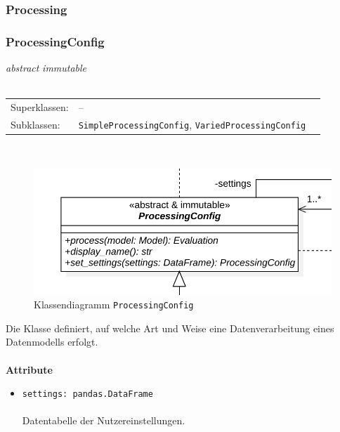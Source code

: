 \documentclass{article}
\begin{document}
\begin{itemize}
\newpage
\subsubsection{Processing}

\subsubsection*{\large{\textbf{ProcessingConfig}\label{cls:ProcessingConfig}}}
\textit{\flqq{}abstract\frqq} \textit{\flqq{}immutable\frqq}\normalsize\\\\
\begin{tabular}{lll}
 Superklassen: & --\\
 Subklassen: & \texttt{SimpleProcessingConfig}, \texttt{VariedProcessingConfig}
\end{tabular}\\
\begin{figure}[H]%
    \centering
    \includegraphics[width=13cm]{entwurf/Entwurf_dokument/img/cls/model/ProcessingConfig.png}
    \caption{Klassendiagramm \texttt{ProcessingConfig}}
\end{figure}

Die Klasse definiert, auf welche Art und Weise eine Datenverarbeitung eines Datenmodells erfolgt.
\\\\

\textbf{Attribute}
\begin{itemize}\setlength\itemsep{3em}
\item \texttt{settings: pandas.DataFrame}\\\\
Datentabelle der Nutzereinstellungen.
\\\\
\end{itemize}


\end{itemize}
\end{document}
